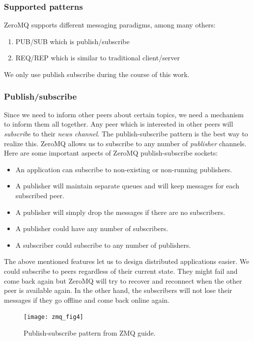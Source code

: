 \subsubsection{Supported patterns}
ZeroMQ supports different messaging paradigms, among many others:
\begin{enumerate}
\item PUB/SUB which is publish/subscribe
\item REQ/REP which is similar to traditional client/server
\end{enumerate}
We only use publish subscribe during the course of this work.

\subsubsection{Publish/subscribe}
Since we need to inform other peers about certain topics, we need a mechanism to inform them all together.
Any peer which is interested in other peers will \textit{subscribe} to their \textit{news channel}. 
The publish-subscribe pattern is the best way to realize this. 
ZeroMQ allows us to subscribe to any number of \textit{publisher} channels. 
Here are some important aspects of ZeroMQ publish-subscribe sockets:
\begin{itemize}
\item An application can subscribe to non-existing or non-running publishers.
\item A publisher will maintain separate queues and will keep messages for each subscribed peer.
\item A publisher will simply drop the messages if there are no subscribers.
\item A publisher could have any number of subscribers.
\item A subscriber could subscribe to any number of publishers.
\end{itemize}

The above mentioned features let us to design distributed applications easier.
We could subscribe to peers regardless of their current state. 
They might fail and come back again but ZeroMQ will try to recover and reconnect when the other peer is available again.
In the other hand, the subscribers will not lose their messages if they go offline and come back online again.

\begin{figure}[h]
  \centering
  \texttt{[image: zmq\_fig4]}
  \caption[Publish-subscribe pattern.]
   {Publish-subscribe pattern from ZMQ guide. \cite{zguide}}
\end{figure}

